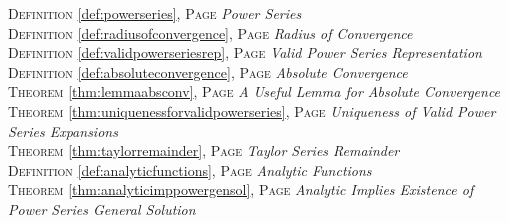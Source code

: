 \begin{multicols}{2}
{\textsc{Definition} \ref{def:powerseries}, \textsc{Page} \pageref{def:powerseries} \textit{Power Series} \\
\textsc{Definition} \ref{def:radiusofconvergence}, \textsc{Page} \pageref{def:radiusofconvergence} \textit{Radius of Convergence} \\
\textsc{Definition} \ref{def:validpowerseriesrep}, \textsc{Page} \pageref{def:validpowerseriesrep} \textit{Valid Power Series Representation} \\
\textsc{Definition} \ref{def:absoluteconvergence}, \textsc{Page} \pageref{def:absoluteconvergence} \textit{Absolute Convergence} \\
\textsc{Theorem} \ref{thm:lemmaabsconv}, \textsc{Page} \pageref{thm:lemmaabsconv} \textit{A Useful Lemma for Absolute Convergence} \\
\textsc{Theorem} \ref{thm:uniquenessforvalidpowerseries}, \textsc{Page} \pageref{thm:uniquenessforvalidpowerseries} \textit{Uniqueness of Valid Power Series Expansions} \\
\textsc{Theorem} \ref{thm:taylorremainder}, \textsc{Page} \pageref{thm:taylorremainder} \textit{Taylor Series Remainder} \\
\textsc{Definition} \ref{def:analyticfunctions}, \textsc{Page} \pageref{def:analyticfunctions} \textit{Analytic Functions} \\
\textsc{Theorem} \ref{thm:analyticimppowergensol}, \textsc{Page} \pageref{thm:analyticimppowergensol} \textit{Analytic Implies Existence of Power Series General Solution} \\

      }
\end{multicols}

